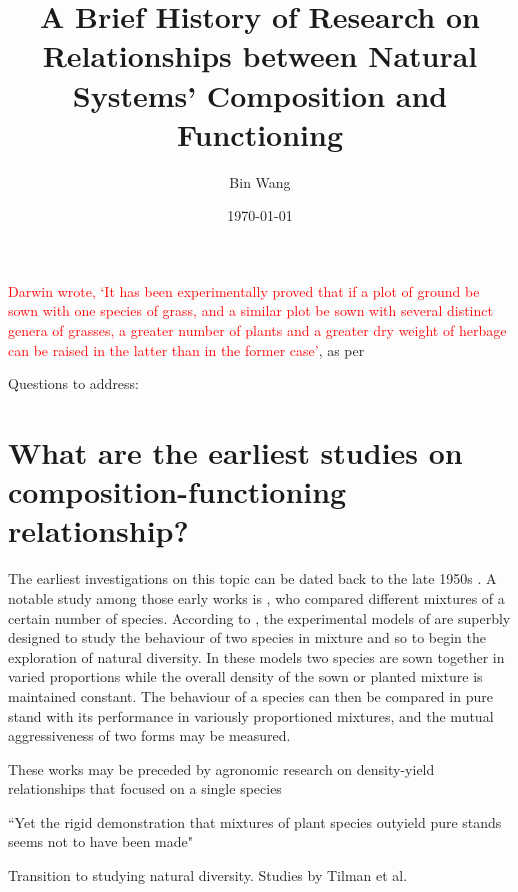 \documentclass[letterpaper, 10pt]{article}
\begin{document}
\setlength{\droptitle}{-10em} 
\title{\textbf{A Brief History of Research on Relationships between Natural Systems' Composition and
Functioning}\vspace{-0em}}
\author{Bin Wang\vspace{-1em}}
\date{\today\vspace{-1em}}
\maketitle

\textcolor{red}{Darwin wrote, `It has been experimentally proved that if a plot of ground be sown with one species of grass, and a similar plot be sown with several distinct genera of grasses, a greater number of plants and a greater dry weight of herbage can be raised in the latter than in the former case'}, as per \citep{harperdarwinian}

Questions to address:

\section{What are the earliest studies on composition-functioning relationship?}

The earliest investigations on this topic can be dated back to the late 1950s \citep{de1960competitionthesis, de1960competition, harperdarwinian}. A notable study among those early works is \citep{de1960competition}, who compared different mixtures of a certain number of species. According to \citep{harperdarwinian}, the experimental models of \citep{de1960competition} are superbly designed to study the behaviour of two species in mixture and so to begin the exploration of natural diversity. In these models two species are sown together in varied proportions while the overall density of the sown or planted mixture is maintained constant. The behaviour of a species can then be compared in pure stand with its performance in variously proportioned mixtures, and the mutual aggressiveness of two forms may be measured.

These works may be preceded by agronomic research on density-yield relationships that focused on a single species \citep{harperdarwinian} 

``Yet the rigid demonstration that mixtures of plant species outyield pure stands seems not to have been made" \citep{harperdarwinian}

Transition to studying natural diversity. Studies by Tilman et al. 
\end{document}
